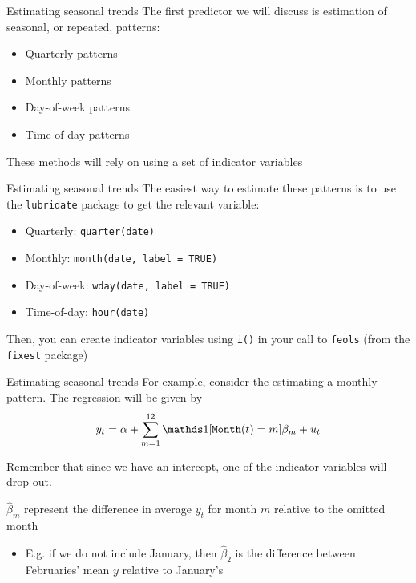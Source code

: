 \documentclass[aspectratio=169,t,11pt,table]{beamer}
\begin{document}
\begin{frame}{Estimating seasonal trends}
  The first predictor we will discuss is estimation of seasonal, or repeated, patterns:
  \begin{itemize}
    \item Quarterly patterns
    \item Monthly patterns
    \item Day-of-week patterns
    \item Time-of-day patterns
  \end{itemize}

  \bigskip
  These methods will rely on using a set of indicator variables
\end{frame}

\begin{frame}{Estimating seasonal trends}
  The easiest way to estimate these patterns is to use the \texttt{lubridate} package to get the relevant variable:
  \begin{itemize}
    \item Quarterly: \texttt{quarter(date)}
    \item Monthly: \texttt{month(date, label = TRUE)}
    \item Day-of-week: \texttt{wday(date, label = TRUE)}
    \item Time-of-day: \texttt{hour(date)}
  \end{itemize}

  \bigskip
  Then, you can create indicator variables using \texttt{i()} in your call to \texttt{feols} (from the \texttt{fixest} package)
\end{frame}

\begin{frame}{Estimating seasonal trends}
  For example, consider the estimating a monthly pattern. 
  The regression will be given by
  $$
    y_t = \alpha + \sum_{m = 1}^{12} \one{\texttt{Month}(t) = m} \beta_m + u_t
  $$

  \bigskip
  Remember that since we have an intercept, one of the indicator variables will drop out.
  
  \bigskip
  $\hat{\beta}_m$ represent the difference in average $y_t$ for month $m$ relative to the omitted month 
  \begin{itemize}
    \item E.g. if we do not include January, then $\hat{\beta}_{2}$ is the difference between Februaries' mean $y$ relative to January's
  \end{itemize}
\end{frame}
\end{document}
